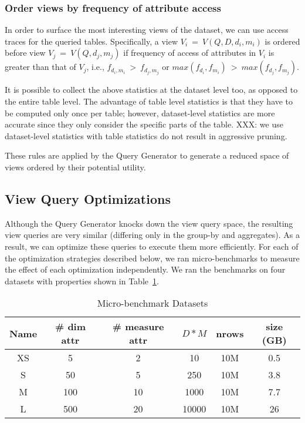 \subsubsection{Order views by frequency of attribute access}
In order to surface
  the most interesting views of the dataset, we can use access traces for the
  queried tables. Specifically, a view $V_i\ =\ V(Q, D, d_i, m_i)$ is ordered
  before view $V_j\ =\ V(Q, d_j, m_j)$ if frequency of access of attributes
  in $V_i$ is greater than that of $V_j$, i.e., $f_{d_i, m_i}\ >\ f_{d_j,
  m_j}$ or $max(f_{d_i}, f_{m_i})\ >\ max(f_{d_j}, f_{m_j})$. 


It is possible to collect the above statistics at the dataset level too, as
opposed to the entire table level. The advantage of table level statistics is
that they have to be computed only once per table; however, dataset-level
statistics are more accurate since they only consider the specific parts of the
table. XXX: we use dataset-level statistics with table statistics do not result
in aggressive pruning. 

These rules are applied by the Query Generator to generate a reduced space of
views ordered by their potential utility.

\subsection{View Query Optimizations}
\label{subsubsec:optimizations}

Although the Query Generator knocks down the view query space, the resulting
view queries are very similar (differing only in the group-by and aggregates).
As a result, we can optimize these queries to execute them more efficiently. For
each of the optimization strategies described below, we ran micro-benchmarks to
measure the effect of each optimization independently. We ran the benchmarks
on four datasets with properties shown in
Table~\ref{tab:micro_benchmark_datasets}.

\begin{table}
{\scriptsize \center
\vspace{-10pt}
\begin{tabular}{|c|c|c|c|c|c|}
\hline
Name & # dim attr & # measure attr & $D * M$ & nrows & size (GB) \\ \hline
\hline
XS & 5 & 2 & 10 & 10M & 0.5 \\ \hline
S & 50 & 5 & 250 & 10M & 3.8 \\ \hline
M & 100 & 10 & 1000 & 10M & 7.7 \\ \hline
L & 500 & 20 & 10000 & 10M & 26 \\ \hline

\end{tabular} 
\vspace{-10pt}
\caption{Micro-benchmark Datasets \label{tab:micro_benchmark_datasets}}
}
\end{table}

